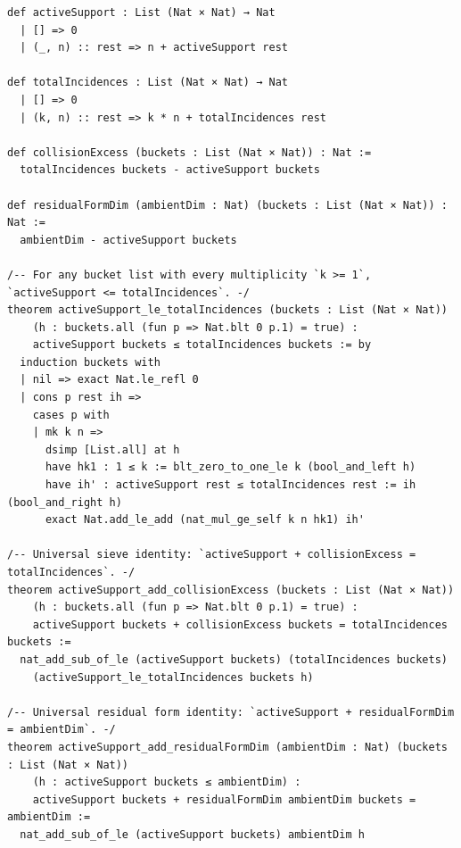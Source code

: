 \documentclass[11pt,a4paper]{article}
\begin{document}
\begin{lstlisting}[caption={Universal multiplicity-bucket sieve conservation laws in \texttt{MathlibPR\_CyclotomicIncidenceSieve.lean}.}]
def activeSupport : List (Nat × Nat) → Nat
  | [] => 0
  | (_, n) :: rest => n + activeSupport rest

def totalIncidences : List (Nat × Nat) → Nat
  | [] => 0
  | (k, n) :: rest => k * n + totalIncidences rest

def collisionExcess (buckets : List (Nat × Nat)) : Nat :=
  totalIncidences buckets - activeSupport buckets

def residualFormDim (ambientDim : Nat) (buckets : List (Nat × Nat)) : Nat :=
  ambientDim - activeSupport buckets

/-- For any bucket list with every multiplicity `k >= 1`, `activeSupport <= totalIncidences`. -/
theorem activeSupport_le_totalIncidences (buckets : List (Nat × Nat))
    (h : buckets.all (fun p => Nat.blt 0 p.1) = true) :
    activeSupport buckets ≤ totalIncidences buckets := by
  induction buckets with
  | nil => exact Nat.le_refl 0
  | cons p rest ih =>
    cases p with
    | mk k n =>
      dsimp [List.all] at h
      have hk1 : 1 ≤ k := blt_zero_to_one_le k (bool_and_left h)
      have ih' : activeSupport rest ≤ totalIncidences rest := ih (bool_and_right h)
      exact Nat.add_le_add (nat_mul_ge_self k n hk1) ih'

/-- Universal sieve identity: `activeSupport + collisionExcess = totalIncidences`. -/
theorem activeSupport_add_collisionExcess (buckets : List (Nat × Nat))
    (h : buckets.all (fun p => Nat.blt 0 p.1) = true) :
    activeSupport buckets + collisionExcess buckets = totalIncidences buckets :=
  nat_add_sub_of_le (activeSupport buckets) (totalIncidences buckets)
    (activeSupport_le_totalIncidences buckets h)

/-- Universal residual form identity: `activeSupport + residualFormDim = ambientDim`. -/
theorem activeSupport_add_residualFormDim (ambientDim : Nat) (buckets : List (Nat × Nat))
    (h : activeSupport buckets ≤ ambientDim) :
    activeSupport buckets + residualFormDim ambientDim buckets = ambientDim :=
  nat_add_sub_of_le (activeSupport buckets) ambientDim h
\end{lstlisting}
\end{document}
